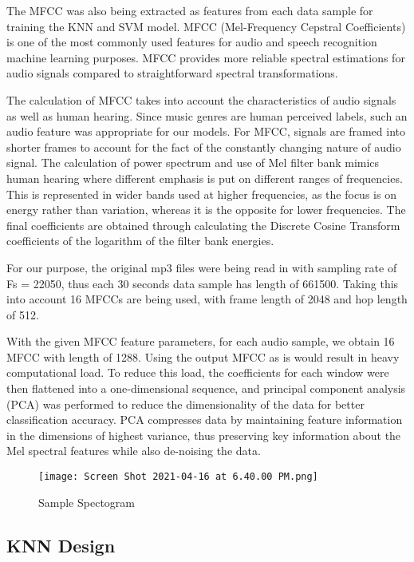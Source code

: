 \documentclass[letterpaper, 12 pt, conference]{ieeeconf}  %
\begin{document}
The MFCC was also being extracted as features from each data sample for training the KNN and SVM model. MFCC (Mel-Frequency Cepstral Coefficients) is one of the most commonly used features for audio and speech recognition machine learning purposes. MFCC provides more reliable spectral estimations for audio signals compared to straightforward spectral transformations. 

The calculation of MFCC takes into account the characteristics of audio signals as well as human hearing. Since music genres are human perceived labels, such an audio feature was appropriate for our models. For MFCC, signals are framed into shorter frames to account for the fact of the constantly changing nature of audio signal. The calculation of power spectrum and use of Mel filter bank mimics human hearing where different emphasis is put on different ranges of frequencies. This is represented in wider bands used at higher frequencies, as the focus is on energy rather than variation, whereas it is the opposite for lower frequencies. The final coefficients are obtained through calculating the Discrete Cosine Transform coefficients of the logarithm of the filter bank energies. 

For our purpose, the original mp3 files were being read in with sampling rate of Fs = 22050, thus each 30 seconds data sample has length of 661500. Taking this into account 16 MFCCs are being used, with frame length of 2048 and hop length of 512. 

With the given MFCC feature parameters, for each audio sample, we obtain 16 MFCC with length of 1288. Using the output MFCC as is would result in heavy computational load. To reduce this load, the coefficients for each window were then flattened into a one-dimensional sequence, and principal component analysis (PCA) was performed to reduce the dimensionality of the data for better classification accuracy. PCA compresses data by maintaining feature information in the dimensions of highest variance, thus preserving key information about the Mel spectral features while also de-noising the data.


\begin{figure*}
  \texttt{[image: Screen Shot 2021-04-16 at 6.40.00 PM.png]}
  \caption{Sample Spectogram}
\end{figure*}


\subsection{KNN Design}
\end{document}
